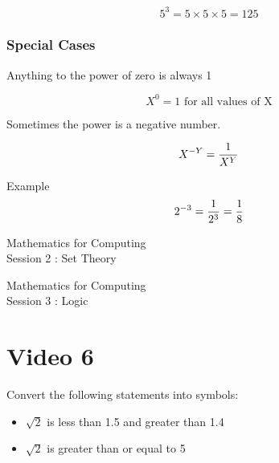 \documentclass[]{report}
\begin{document}
\[  5^ 3 = 5 \times 5 \times 5 =125 \]

\subsubsection{Special Cases}

Anything to the power of zero is always 1

\[  X^ 0 = 1 \mbox{ for all values of X} \]

Sometimes the power is a negative number.

\[  X^{-Y} = { 1 \over X^Y}  \]

Example 
\[  2^{-3} = { 1 \over 2^3} = { 1 \over 8}  \]


\newpage
\begin{center}
\huge{Mathematics for Computing}\\
{ Session 2 : Set Theory}
\end{center}



\newpage
\begin{center}
\huge{Mathematics for Computing}\\
{ Session 3 : Logic}
\end{center}




\section{Video 6}


Convert the following statements into symbols:

\begin{itemize}
\item $\sqrt{2}$ is less than 1.5 and greater than 1.4
\item $\sqrt{2}$ is greater than or equal to 5
\end{itemize}



\end{document}

